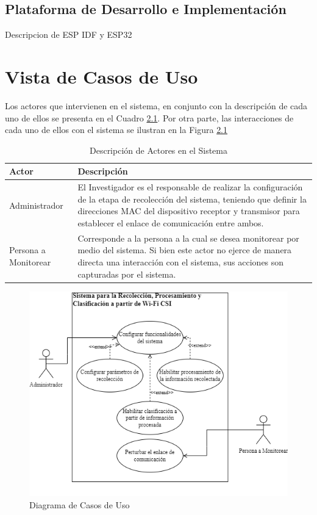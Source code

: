 \documentclass{scrreprt}
\begin{document}
\section{Plataforma de Desarrollo e Implementación}
Descripcion de ESP IDF y ESP32

\chapter{Vista de Casos de Uso}

Los actores que intervienen en el sistema, en conjunto con la descripción de cada uno de ellos se presenta en el Cuadro \ref{tab:actores}. Por otra parte, las interacciones de cada uno de ellos con el sistema se ilustran en la Figura \ref{fig:casos_uso}
\begin{table}[h!]
    \caption{Descripción de Actores en el Sistema}
    \begin{tabularx}{\textwidth}{|l | X |}
        \hline
        \textbf{Actor} & \textbf{Descripción} \\
        \hline 
        Administrador & El Investigador es el responsable de realizar la configuración de la etapa de recolección del sistema, teniendo que definir la direcciones MAC del dispositivo receptor y transmisor para establecer el enlace de comunicación entre ambos. \\
        \hline 
        Persona a Monitorear & Corresponde a la persona a la cual se desea monitorear por medio del sistema. Si bien este actor no ejerce de manera directa una interacción con el sistema, sus acciones son capturadas por el sistema. \\ 
        \hline 
    \end{tabularx}
    \label{tab:actores}
\end{table}

\begin{figure}[h!]
    \centering
    \includegraphics[scale = 0.57]{images/casos_uso.png}
    \caption{Diagrama de Casos de Uso}
    \label{fig:casos_uso}
\end{figure}
\end{document}
